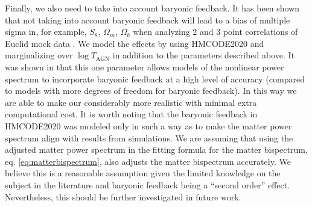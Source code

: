 \documentclass[11pt]{article} %
\begin{document}
Finally, we also need to take into account baryonic feedback. It has been shown that not taking into account baryonic feedback will lead to a bias of multiple sigma in, for example, $S_8$, $\Omega_m$, $\Omega_b$ when analyzing 2 and 3 point correlations of Euclid mock data \cite{Burger_2026}. We model the effects by using HMCODE2020 \cite{Mead_2021} and marginalizing over $\log T_{\text{AGN}}$ in addition to the parameters described above. It was shown in \cite{Mead_2021} that this one parameter allows models of the nonlinear power spectrum to incorporate baryonic feedback at a high level of accuracy (compared to models with more degrees of freedom for baryonic feedback). In this way we are able to make our considerably more realistic with minimal extra computational cost. It is worth noting that the baryonic feedback in HMCODE2020 was modeled only in such a way as to make the matter power spectrum align with results from simulations. We are assuming that using the adjusted matter power spectrum in the fitting formula for the matter bispectrum, eq. \ref{eq:matterbispectrum}, also adjusts the matter bispectrum accurately. We believe this is a reasonable assumption given the limited knowledge on the subject in the literature and baryonic feedback being a ``second order'' effect. Nevertheless, this should be further investigated in future work.
\end{document}
